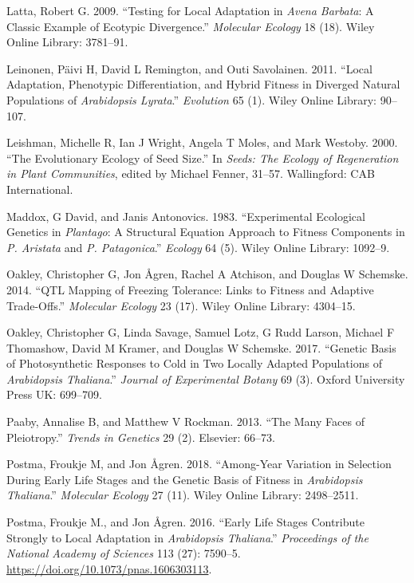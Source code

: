 \documentclass[]{article}
\begin{document}
\leavevmode\hypertarget{ref-Latta2009}{}%
Latta, Robert G. 2009. ``Testing for Local Adaptation in \emph{Avena Barbata}: A Classic Example of Ecotypic Divergence.'' \emph{Molecular Ecology} 18 (18). Wiley Online Library: 3781--91.

\leavevmode\hypertarget{ref-leinonen2011local}{}%
Leinonen, Päivi H, David L Remington, and Outi Savolainen. 2011. ``Local Adaptation, Phenotypic Differentiation, and Hybrid Fitness in Diverged Natural Populations of \emph{Arabidopsis Lyrata}.'' \emph{Evolution} 65 (1). Wiley Online Library: 90--107.

\leavevmode\hypertarget{ref-Leishman2000}{}%
Leishman, Michelle R, Ian J Wright, Angela T Moles, and Mark Westoby. 2000. ``The Evolutionary Ecology of Seed Size.'' In \emph{Seeds: The Ecology of Regeneration in Plant Communities}, edited by Michael Fenner, 31--57. Wallingford: CAB International.

\leavevmode\hypertarget{ref-Maddox1983}{}%
Maddox, G David, and Janis Antonovics. 1983. ``Experimental Ecological Genetics in \emph{Plantago}: A Structural Equation Approach to Fitness Components in \emph{P. Aristata} and \emph{P. Patagonica}.'' \emph{Ecology} 64 (5). Wiley Online Library: 1092--9.

\leavevmode\hypertarget{ref-oakley2014qtl}{}%
Oakley, Christopher G, Jon Ågren, Rachel A Atchison, and Douglas W Schemske. 2014. ``QTL Mapping of Freezing Tolerance: Links to Fitness and Adaptive Trade-Offs.'' \emph{Molecular Ecology} 23 (17). Wiley Online Library: 4304--15.

\leavevmode\hypertarget{ref-oakley2017genetic}{}%
Oakley, Christopher G, Linda Savage, Samuel Lotz, G Rudd Larson, Michael F Thomashow, David M Kramer, and Douglas W Schemske. 2017. ``Genetic Basis of Photosynthetic Responses to Cold in Two Locally Adapted Populations of \emph{Arabidopsis Thaliana}.'' \emph{Journal of Experimental Botany} 69 (3). Oxford University Press UK: 699--709.

\leavevmode\hypertarget{ref-paaby2013many}{}%
Paaby, Annalise B, and Matthew V Rockman. 2013. ``The Many Faces of Pleiotropy.'' \emph{Trends in Genetics} 29 (2). Elsevier: 66--73.

\leavevmode\hypertarget{ref-postma2018among}{}%
Postma, Froukje M, and Jon Ågren. 2018. ``Among-Year Variation in Selection During Early Life Stages and the Genetic Basis of Fitness in \emph{Arabidopsis Thaliana}.'' \emph{Molecular Ecology} 27 (11). Wiley Online Library: 2498--2511.

\leavevmode\hypertarget{ref-postma_early_2016}{}%
Postma, Froukje M., and Jon Ågren. 2016. ``Early Life Stages Contribute Strongly to Local Adaptation in \emph{Arabidopsis Thaliana}.'' \emph{Proceedings of the National Academy of Sciences} 113 (27): 7590--5. \url{https://doi.org/10.1073/pnas.1606303113}.
\end{document}
